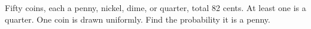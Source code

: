 Fifty coins, each a penny, nickel, dime, or quarter, total 82 cents. At least one is a quarter. One coin is drawn uniformly. Find the probability it is a penny.
